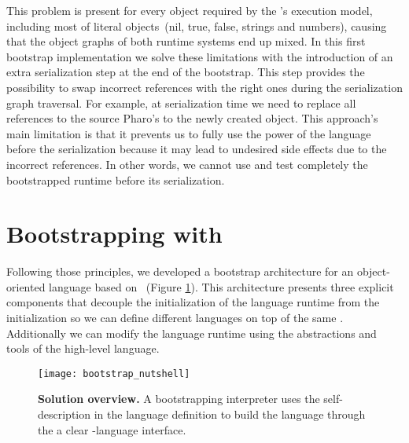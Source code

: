 This problem is present for every object required by the \VM's execution model, including most of literal objects~(nil, true, false, strings and numbers), causing that the object graphs of both runtime systems end up mixed.
In this first bootstrap implementation we solve these limitations with the introduction of an extra serialization step at the end of the bootstrap.
This step provides the possibility to swap incorrect references with the right ones during the serialization graph traversal. For example, at serialization time we need to replace all references to the source Pharo's  to the newly created  object.
This approach's main limitation is that it prevents us to fully use the power of the language before the serialization because it may lead to undesired side effects due to the incorrect references.
In other words, we cannot use and test completely the bootstrapped runtime before its serialization.

\section{Bootstrapping with \Vtt}

Following those principles, we developed a bootstrap architecture for an object-oriented language based on \Vtt~(Figure \ref{fig:bootstrapping_overview}). This architecture presents three explicit components that decouple the initialization of the language runtime from the \VM initialization so we can define different languages on top of the same \VM. Additionally we can modify the language runtime using the abstractions and tools of the high-level language.

\begin{figure}[ht]
\center
\texttt{[image: bootstrap\_nutshell]}
\caption{\textbf{Solution overview.} A bootstrapping interpreter uses the self-description in the language definition to build the language through the a clear \VM-language interface.\label{fig:bootstrapping_overview}}
\end{figure}

